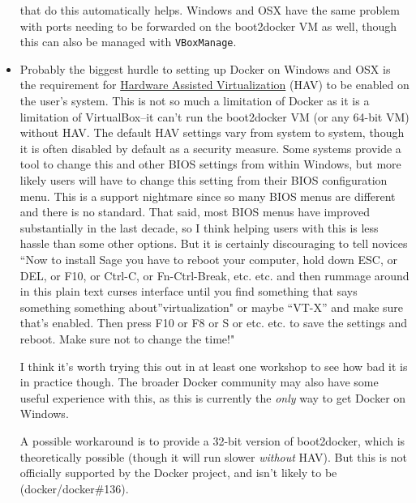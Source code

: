 \begin{itemize}
  that do this automatically helps. Windows and OSX have the same
  problem with ports needing to be forwarded on the boot2docker VM as
  well, though this can also be managed with \texttt{VBoxManage}.
\item
  Probably the biggest hurdle to setting up Docker on Windows and OSX is
  the requirement for
  \href{https://en.wikipedia.org/wiki/Hardware-assisted_virtualization}{Hardware
  Assisted Virtualization} (HAV) to be enabled on the user's system.
  This is not so much a limitation of Docker as it is a limitation of
  VirtualBox--it can't run the boot2docker VM (or any 64-bit VM) without
  HAV. The default HAV settings vary from system to system, though it is
  often disabled by default as a security measure. Some systems provide
  a tool to change this and other BIOS settings from within Windows, but
  more likely users will have to change this setting from their BIOS
  configuration menu. This is a support nightmare since so many BIOS
  menus are different and there is no standard. That said, most BIOS
  menus have improved substantially in the last decade, so I think
  helping users with this is less hassle than some other options. But it
  is certainly discouraging to tell novices ``Now to install Sage you
  have to reboot your computer, hold down ESC, or DEL, or F10, or
  Ctrl-C, or Fn-Ctrl-Break, etc. etc. and then rummage around in this
  plain text curses interface until you find something that says
  something something about''virtualization" or maybe ``VT-X'' and make
  sure that's enabled. Then press F10 or F8 or S or etc. etc. to save
  the settings and reboot. Make sure not to change the time!"

  I think it's worth trying this out in at least one workshop to see how
  bad it is in practice though. The broader Docker community may also
  have some useful experience with this, as this is currently the
  \emph{only} way to get Docker on Windows.

  A possible workaround is to provide a 32-bit version of boot2docker,
  which is theoretically possible (though it will run slower
  \emph{without} HAV). But this is not officially supported by the
  Docker project, and isn't likely to be (docker/docker\#136).
\end{itemize}
